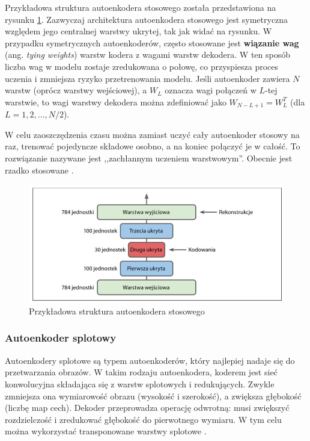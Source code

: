 \documentclass[12pt]{mwbk}
\theoremstyle{plain}
\theoremstyle{definition}
\theoremstyle{remark}
\newcommand\zrodlo[1]{\par\vspace{-3mm}{\small\textit{Źródło: }#1 }}
\begin{document}
Przykładowa struktura autoenkodera stosowego została przedstawiona na rysunku \ref{fig:autoenkoder-stosowy}. Zazwyczaj architektura autoenkodera stosowego jest symetryczna względem jego centralnej warstwy ukrytej, tak jak widać na rysunku. 
W przypadku symetrycznych autoenkoderów, często stosowane jest \textbf{wiązanie wag} (ang. \emph{tying weights}) warstw kodera z wagami warstw dekodera. W ten sposób liczba wag w modelu zostaje zredukowana o połowę, co przyspiesza proces uczenia i zmniejsza ryzyko przetrenowania modelu. Jeśli autoenkoder zawiera $N$ warstw (oprócz warstwy wejściowej), a $W_L$ oznacza wagi połączeń w $L$-tej warstwie, to wagi warstwy dekodera można zdefiniować jako $W_{N-L+1}=W_L^T$ (dla $L=1,2,\ldots, N/2$).

W celu zaoszczędzenia czasu można zamiast uczyć cały autoenkoder stosowy na raz, trenować pojedyncze składowe osobno, a na koniec połączyć je w całość. To rozwiązanie nazywane jest ,,zachłannym uczeniem warstwowym''. Obecnie jest rzadko stosowane \cite{geron}.

\begin{figure}[!h]
	\centering
	\includegraphics[width=\linewidth]{rys/autoenkoder_stosowy.png}
	\caption{Przykładowa struktura autoenkodera stosowego}
	\zrodlo{\cite{geron}}
	\label{fig:autoenkoder-stosowy}
\end{figure}

\newpage

\subsubsection{Autoenkoder splotowy}

Autoenkodery splotowe są typem autoenkoderów, który najlepiej nadaje się do przetwarzania obrazów. W takim rodzaju autoenkodera, koderem jest sieć konwolucyjna składająca się z warstw splotowych i redukujących. Zwykle zmniejsza ona wymiarowość obrazu (wysokość i szerokość), a zwiększa głębokość (liczbę map cech). Dekoder przeprowadza operację odwrotną: musi zwiększyć rozdzielczość i zredukować głębokość do pierwotnego wymiaru. W tym celu można wykorzystać transponowane warstwy splotowe \cite{geron}.
\end{document}
